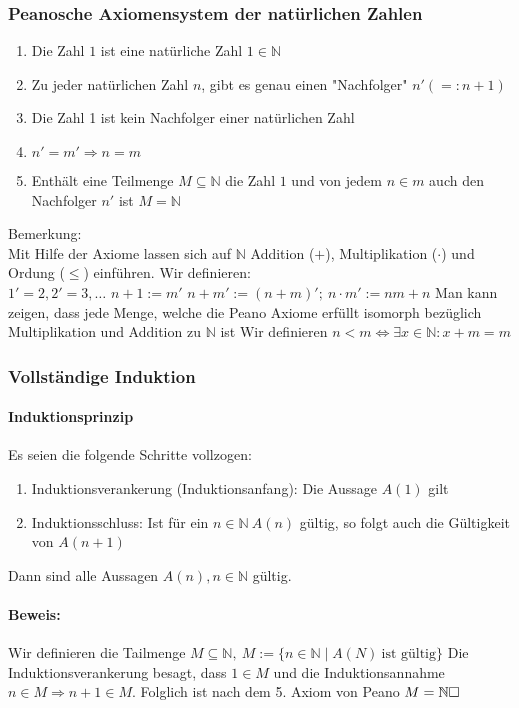 \documentclass[a4paper]{scrartcl}
\begin{document}
\subsubsection{Peanosche Axiomensystem der natürlichen Zahlen}
\label{sec-2-4-1}
\begin{enumerate}
\item Die Zahl $1$ ist eine natürliche Zahl $1\in\mathbb{N}$
\item Zu jeder natürlichen Zahl $n$, gibt es genau einen "Nachfolger" $n' (=: n+1)$
\item Die Zahl 1 ist kein Nachfolger einer natürlichen Zahl
\item $n' = m' \Rightarrow n = m$
\item Enthält eine Teilmenge  $M \subseteq \mathbb{N}$ die Zahl $1$ und von jedem $n\in m$ auch den Nachfolger $n'$ ist $M = \mathbb{N}$
\end{enumerate}
Bemerkung: \\
    Mit Hilfe der Axiome lassen sich auf $\mathbb{N}$ Addition ($+$), Multiplikation ($\cdot$) und Ordung ($\leq$) einführen.
Wir definieren: \\
    $1' = 2, 2' = 3, \ldots$
$n + 1 := m'$
$n + m' := (n+m)';~n\cdot m' := n m + n$
Man kann zeigen, dass jede Menge, welche die Peano Axiome erfüllt isomorph bezüglich Multiplikation und Addition zu $\mathbb{N}$ ist
Wir definieren $n < m \Leftrightarrow \exists x\in \mathbb{N}: x + m = m$
\subsubsection{Vollständige Induktion}
\label{sec-2-4-2}
\paragraph{Induktionsprinzip}
\label{sec-2-4-2-1}
Es seien die folgende Schritte vollzogen:
\begin{enumerate}
\item Induktionsverankerung (Induktionsanfang): Die Aussage $A(1)$ gilt
\item Induktionsschluss: Ist für ein $n\in\mathbb{N}~A(n)$ gültig, so folgt auch die Gültigkeit von $A(n+1)$
\end{enumerate}
Dann sind alle Aussagen $A(n),n\in\mathbb{N}$ gültig.
\paragraph{Beweis:}
\label{sec-2-4-2-2}
Wir definieren die Tailmenge $M\subseteq\mathbb{N},~M:=\{n\in \mathbb{N}\mid A(N)~\text{ist gültig}\}$
Die Induktionsverankerung besagt, dass $1\in M$ und die Induktionsannahme $n\in M\Rightarrow n + 1 \in M$. Folglich ist nach dem 5. Axiom von Peano $M = \mathbb{N}\hfill\square$
\end{document}
